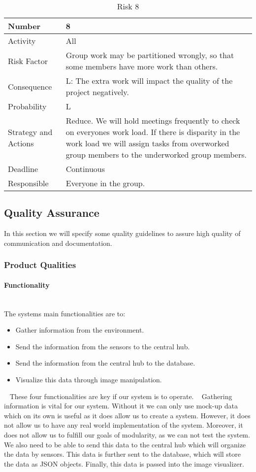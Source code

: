 \documentclass[../document.tex]{subfiles}
\begin{document}
\begin{table}[H]
\caption{Risk 8}
\begin{tabularx}{\textwidth}{|l|X|}
\hline
Number
&8
\\ \hline Activity
&All
\\ \hline Risk Factor
&Group work may be partitioned wrongly, so that some members have more work than others.
\\ \hline Consequence
&L: The extra work will impact the quality of the project negatively.
\\ \hline Probability
&L
\\ \hline Strategy and Actions
&Reduce. We will hold meetings frequently to check on everyones work load. If there is disparity in the work load we will assign tasks from overworked group members to the underworked group members.
\\ \hline Deadline
&Continuous
\\ \hline Responsible
&Everyone in the group.
\\ \hline 
\end{tabularx}
\end{table}

\subsection{Quality Assurance}
In this section we will specify some quality guidelines to assure high quality of communication and documentation.

\subsubsection{Product Qualities}

\paragraph{Functionality} \ \\
The systems main functionalities are to:
\begin{itemize}
\item
Gather information from the environment.
\item
Send the information from the sensors to the central hub.
\item
Send the information from the central hub to the database.
\item
Visualize this data through image manipulation.
\end{itemize}
\ \newline
These four functionalities are key if our system is to operate.
\newline \ \newline
Gathering information is vital for our system. Without it we can only use mock-up data which on its own is useful as it does allow us to create a system. However, it does not allow us to have any real world implementation of the system. Moreover, it does not allow us to fulfill our goals of modularity, as we can not test the system. We also need to be able to send this data to the central hub which will organize the data by sensors. This data is further sent to the database, which will store the data as JSON objects. Finally, this data is passed into the image visualizer. 
\end{document}
